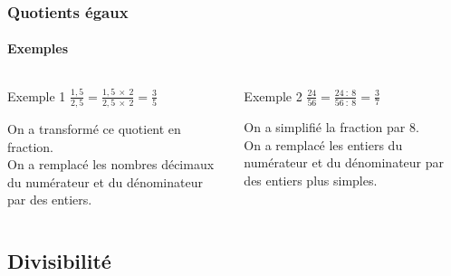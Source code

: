 \documentclass{beamer}
\begin{document}
\begin{frame}
	\frametitle{Quotients égaux}  
	\framesubtitle{Exemples}	
	
	
	\begin{columns}[onlytextwidth]
		\begin{column}{0.465\textwidth}
			\begin{exampleblock}{Exemple 1}
				{\LARGE $\frac{1,5}{2,5} = \frac{1,5 \: \times  \: 2}{2,5 \: \times \: 2} = \frac{3}{5}$} 
				\vspace*{5mm}
				
				On a transformé ce quotient en fraction.\\
				
				On a remplacé les nombres décimaux du numérateur et du dénominateur par des entiers.\pause
			\end{exampleblock}
		\end{column}
		\begin{column}{0.465\textwidth}
			\begin{exampleblock}{Exemple 2}
				{\LARGE $\frac{24}{56} = \frac{24 \: :  \: 8}{56 \: : \: 8} = \frac{3}{7}$} 
				\vspace*{5mm}
				
				On a simplifié la fraction par 8.\\
				
				On a remplacé les entiers du numérateur et du dénominateur par des entiers plus simples.
			\end{exampleblock}
		\end{column}
	\end{columns}
	
	
	
\end{frame}

\subsection{Divisibilité}
\end{document}

